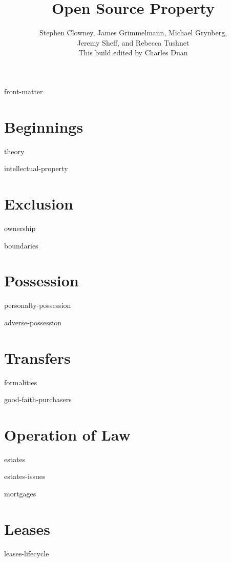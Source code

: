 \documentclass[12pt]{book}
\title{Open Source Property}
\author{Stephen Clowney, James Grimmelmann, Michael Grynberg,\\
Jeremy Sheff, and Rebecca Tushnet \\[12pt]
This build edited by Charles Duan}
\begin{document}
\sloppy
\raggedbottom
\frenchspacing
{}                                                
\parskip=0pt                                                  



\makevolume

\tableofcontents

\module front-matter

\mainmatter

\part{Beginnings}

\module theory

\module intellectual-property

\part{Exclusion}

\module ownership

\module boundaries

\part{Possession}

\module personalty-possession

\module adverse-possession


\part{Transfers}

\module formalities

\module good-faith-purchasers



\part{Operation of Law}

\module estates

\module estates-issues

\module mortgages



\part{Leases}

\module leases-lifecycle
\end{document}
